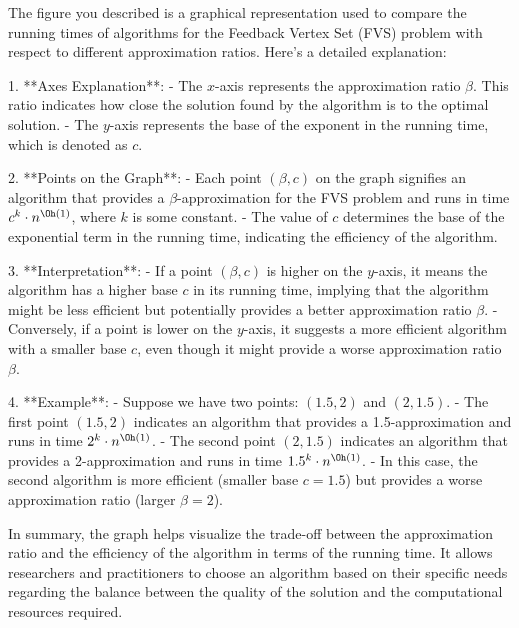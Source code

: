 The figure you described is a graphical representation used to compare the running times of algorithms for the Feedback Vertex Set (FVS) problem with respect to different approximation ratios. Here's a detailed explanation:

1. **Axes Explanation**:
   - The \( x \)-axis represents the approximation ratio \(\beta\). This ratio indicates how close the solution found by the algorithm is to the optimal solution.
   - The \( y \)-axis represents the base of the exponent in the running time, which is denoted as \( c \).

2. **Points on the Graph**:
   - Each point \((\beta, c)\) on the graph signifies an algorithm that provides a \(\beta\)-approximation for the FVS problem and runs in time \( c^k \cdot n^{\Oh(1)} \), where \( k \) is some constant.
   - The value of \( c \) determines the base of the exponential term in the running time, indicating the efficiency of the algorithm.

3. **Interpretation**:
   - If a point \((\beta, c)\) is higher on the \( y \)-axis, it means the algorithm has a higher base \( c \) in its running time, implying that the algorithm might be less efficient but potentially provides a better approximation ratio \(\beta\).
   - Conversely, if a point is lower on the \( y \)-axis, it suggests a more efficient algorithm with a smaller base \( c \), even though it might provide a worse approximation ratio \(\beta\).

4. **Example**:
   - Suppose we have two points: \((1.5, 2)\) and \((2, 1.5)\).
     - The first point \((1.5, 2)\) indicates an algorithm that provides a 1.5-approximation and runs in time \( 2^k \cdot n^{\Oh(1)} \).
     - The second point \((2, 1.5)\) indicates an algorithm that provides a 2-approximation and runs in time \( 1.5^k \cdot n^{\Oh(1)} \).
   - In this case, the second algorithm is more efficient (smaller base \( c = 1.5 \)) but provides a worse approximation ratio (larger \(\beta = 2\)).

In summary, the graph helps visualize the trade-off between the approximation ratio and the efficiency of the algorithm in terms of the running time. It allows researchers and practitioners to choose an algorithm based on their specific needs regarding the balance between the quality of the solution and the computational resources required.
